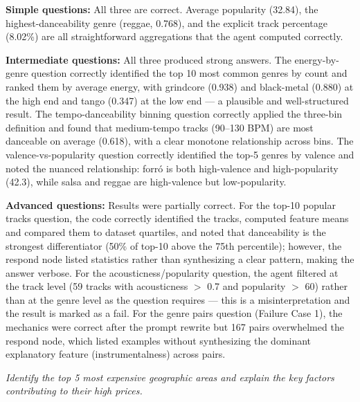 \documentclass[12pt, oneside]{report}
\begin{document}

\textbf{Simple questions:} All three are correct. Average popularity (32.84), the highest-danceability genre (reggae, 0.768), and the explicit track percentage (8.02\%) are all straightforward aggregations that the agent computed correctly.

\textbf{Intermediate questions:} All three produced strong answers. The energy-by-genre question correctly identified the top 10 most common genres by count and ranked them by average energy, with grindcore (0.938) and black-metal (0.880) at the high end and tango (0.347) at the low end --- a plausible and well-structured result. The tempo-danceability binning question correctly applied the three-bin definition and found that medium-tempo tracks (90--130 BPM) are most danceable on average (0.618), with a clear monotone relationship across bins. The valence-vs-popularity question correctly identified the top-5 genres by valence and noted the nuanced relationship: forró is both high-valence and high-popularity (42.3), while salsa and reggae are high-valence but low-popularity.

\textbf{Advanced questions:} Results were partially correct. For the top-10 popular tracks question, the code correctly identified the tracks, computed feature means and compared them to dataset quartiles, and noted that danceability is the strongest differentiator (50\% of top-10 above the 75th percentile); however, the respond node listed statistics rather than synthesizing a clear pattern, making the answer verbose. For the acousticness/popularity question, the agent filtered at the track level (59 tracks with acousticness $>$ 0.7 and popularity $>$ 60) rather than at the genre level as the question requires --- this is a misinterpretation and the result is marked as a fail. For the genre pairs question (Failure Case 1), the mechanics were correct after the prompt rewrite but 167 pairs overwhelmed the respond node, which listed examples without synthesizing the dominant explanatory feature (instrumentalness) across pairs.




\textit{Identify the top 5 most expensive geographic areas and explain the key factors contributing to their high prices.}
\end{document}

